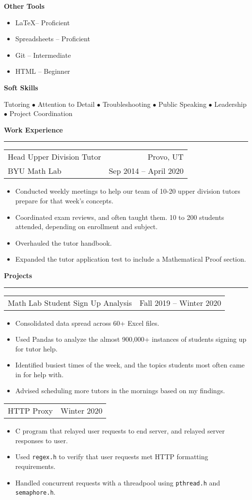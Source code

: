 \documentclass{article}
\newenvironment{compactItemize}{
  \begin{itemize}[itemsep=0ex, parsep=0ex, partopsep=0ex, topsep= -7pt]
}{
  \end{itemize}
}
\newcommand{\jobInfo}[4]{
  \begingroup
  \setlength{\tabcolsep}{0ex}
  \begin{tabularx}{\linewidth}{X r}
    #1 & %
    #2\\ %
    #3 & %
    #4   %
  \end{tabularx}%
  \endgroup%
}
\newcommand{\project}[2]{
  \begingroup
  \setlength{\tabcolsep}{0ex}
  \begin{tabularx}{\linewidth}{X r}
    #1 & %
    #2\\ %
  \end{tabularx}%
  \endgroup%
}
\begin{document}
\textbf{Other Tools}
\begin{multicols}{2}
  \begin{compactItemize}
    \item \LaTeX -- Proficient
    \item Spreadsheets -- Proficient
    \item Git -- Intermediate
    \item HTML -- Beginner
  \end{compactItemize}
\end{multicols}

\textbf{Soft Skills}
  \begin{center}
  Tutoring $\bullet$ Attention to Detail $\bullet$ Troubleshooting $\bullet$ Public Speaking $\bullet$ Leadership $\bullet$ Project Coordination
  \end{center}

\textbf{Work Experience}
\smallskip
\hrule

\jobInfo{Head Upper Division Tutor}{Provo, UT}{BYU Math Lab}{Sep 2014 -- April 2020}
\begin{compactItemize}
  \item Conducted weekly meetings to help our team of 10-20 upper division tutors prepare for that week's concepts.
  \item Coordinated exam reviews, and often taught them.  10 to 200 students attended, depending on enrollment and subject.
  \item Overhauled the tutor handbook.
  \item Expanded the tutor application test to include a Mathematical Proof section.
\end{compactItemize}
\medskip
\textbf{Projects %
}
\smallskip
\hrule

\project{Math Lab Student Sign Up Analysis}{Fall 2019 -- Winter 2020}
\begin{compactItemize}
  \item Consolidated data spread across 60+ Excel files.
  \item Used Pandas to analyze the almost 900,000+ instances of students signing up for tutor help.
  \item Identified busiest times of the week, and the topics students most often came in for help with.
  \item Advised scheduling more tutors in the mornings based on my findings.
\end{compactItemize}
\medskip

\project{HTTP Proxy}{Winter 2020}
\begin{compactItemize}
  \item C program that relayed user requests to end server, and relayed server responses to user.
  \item Used \texttt{regex.h} to verify that user requests met HTTP formatting requirements.
  \item Handled concurrent requests with a threadpool using \texttt{pthread.h} and \texttt{semaphore.h}.
\end{compactItemize}
\medskip
\end{document}
